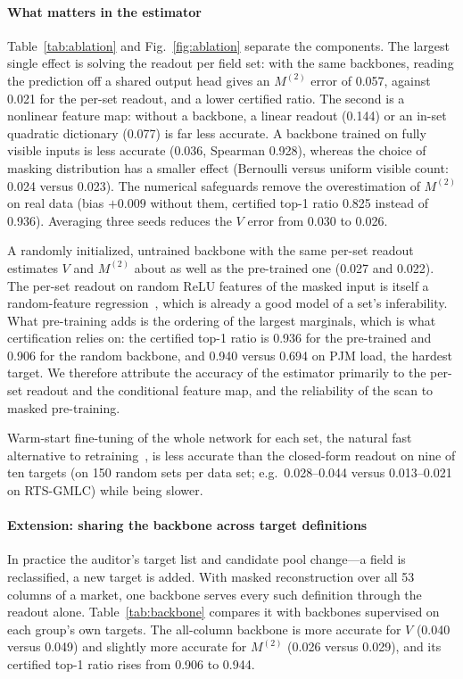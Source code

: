\paragraph{What matters in the estimator}
Table~\ref{tab:ablation} and Fig.~\ref{fig:ablation} separate the components. The largest
single effect is solving the readout per field set: with the same backbones, reading the
prediction off a shared output head gives an $M^{(2)}$ error of 0.057, against 0.021 for the
per-set readout, and a lower certified ratio. The second is a nonlinear feature map:
without a backbone, a linear readout (0.144) or an in-set quadratic dictionary (0.077) is far
less accurate. A backbone trained on fully visible inputs is less accurate (0.036, Spearman 0.928), whereas the choice of masking distribution has a smaller effect (Bernoulli versus uniform visible count: 0.024 versus
0.023). The numerical safeguards remove the overestimation of $M^{(2)}$ on real data (bias
$+0.009$ without them, certified top-1 ratio 0.825 instead of 0.936). Averaging three seeds
reduces the $V$ error from 0.030 to 0.026.

A randomly initialized,
untrained backbone with the same per-set readout estimates $V$ and $M^{(2)}$ about as well as the
pre-trained one (0.027 and 0.022). The per-set readout on random ReLU features of the masked input
is itself a random-feature regression~\cite{rahimi2007random}, which is already a good model of a
set's inferability. What pre-training adds is the ordering of the largest marginals, which is what
certification relies on: the certified top-1 ratio is 0.936 for the pre-trained and 0.906 for the
random backbone, and 0.940 versus 0.694 on PJM load, the hardest target. We therefore attribute the
accuracy of the estimator primarily to the per-set readout and the conditional feature map, and the
reliability of the scan to masked pre-training.

Warm-start fine-tuning of the whole network for each set, the natural fast alternative to
retraining~\cite{sun2025warmstart}, is less accurate than the closed-form readout on nine of ten
targets (on 150 random sets per data set; e.g.\ 0.028--0.044 versus 0.013--0.021 on RTS-GMLC)
while being slower.



\paragraph{Extension: sharing the backbone across target definitions}
In practice the auditor's target list and candidate pool change---a field is reclassified, a new
target is added. With masked reconstruction over all 53 columns of a market, one backbone serves
every such definition through the readout alone. Table~\ref{tab:backbone} compares it with
backbones supervised on each group's own targets. The all-column backbone is more accurate for
$V$ (0.040 versus 0.049) and slightly more accurate for $M^{(2)}$ (0.026 versus 0.029), and its
certified top-1 ratio rises from 0.906 to 0.944.

